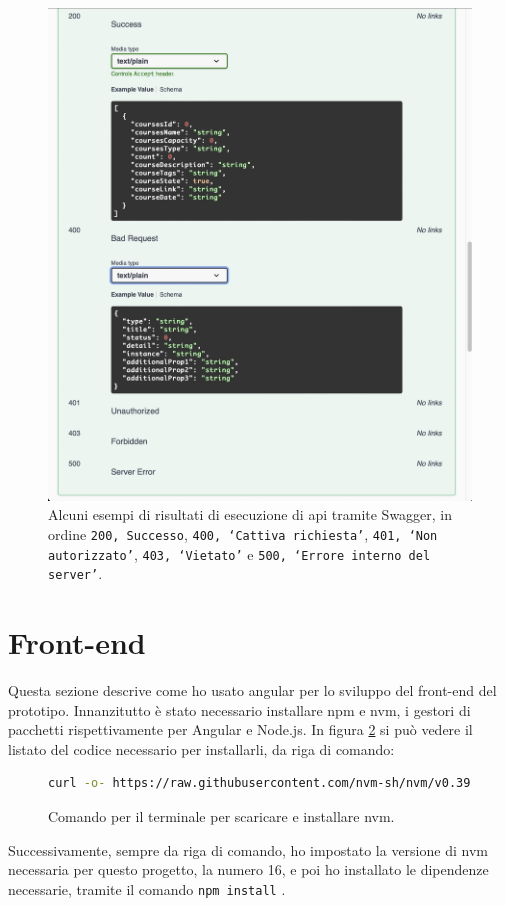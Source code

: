 \begin{figure}[H]
\centering
\includegraphics[width=1\textwidth]{Images/swagger success.jpg}
\caption{\label{fig:swagger success}Alcuni esempi di risultati di esecuzione di \acrshort{api} tramite Swagger, in ordine \texttt{200, Successo}, \texttt{400, `Cattiva richiesta'}, \texttt{401, `Non autorizzato'}, \texttt{403, `Vietato'} e \texttt{500, `Errore interno del server'}.}
\end{figure}


\section{Front-end}\label{sec:front-end}
Questa sezione descrive come ho usato \gls{angular} per lo sviluppo del front-end del prototipo.
Innanzitutto è stato necessario installare \acrfull{npm} e \acrfull{nvm}, i gestori di pacchetti rispettivamente per Angular e Node.js. In figura \ref{fig:installing nvm} si può vedere il listato del codice necessario per installarli, da riga di comando:
\begin{figure}[H]
\centering
\begin{lstlisting}[language=bash]
curl -o- https://raw.githubusercontent.com/nvm-sh/nvm/v0.39.0/   install.sh | bash
\end{lstlisting}
\caption{\label{fig:installing nvm}Comando per il terminale per scaricare e installare \acrshort{nvm}.}
\end{figure}
Successivamente, sempre da riga di comando, ho impostato la versione di \acrshort{nvm} necessaria per questo progetto, la numero 16, e poi ho installato le dipendenze necessarie, tramite il comando \texttt{npm install} \cite{nmpInstall}.

